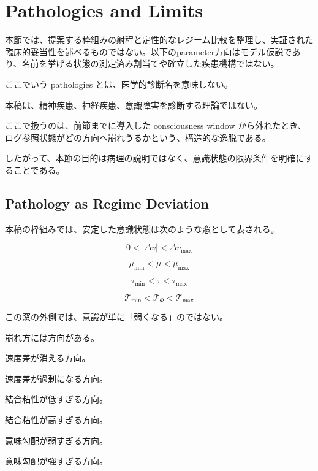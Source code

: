 \section{Pathologies and Limits}


本節では、提案する枠組みの射程と定性的なレジーム比較を整理し、実証された臨床的妥当性を述べるものではない。以下のparameter方向はモデル仮説であり、名前を挙げる状態の測定済み割当てや確立した疾患機構ではない。

ここでいう pathologies とは、医学的診断名を意味しない。

本稿は、精神疾患、神経疾患、意識障害を診断する理論ではない。

ここで扱うのは、前節までに導入した consciousness window から外れたとき、ログ参照状態がどの方向へ崩れうるかという、構造的な逸脱である。

したがって、本節の目的は病理の説明ではなく、意識状態の限界条件を明確にすることである。

\subsection{Pathology as Regime Deviation}

本稿の枠組みでは、安定した意識状態は次のような窓として表される。

\begin{equation}
0 < |\Delta v| < \Delta v_{\max}
\end{equation}

\begin{equation}
\mu_{\min} < \mu < \mu_{\max}
\end{equation}

\begin{equation}
\tau_{\min} < \tau < \tau_{\max}
\end{equation}

\begin{equation}
\mathcal{T}_{\min}
<
\mathcal{T}_{\Phi}
<
\mathcal{T}_{\max}
\end{equation}

この窓の外側では、意識が単に「弱くなる」のではない。

崩れ方には方向がある。

速度差が消える方向。

速度差が過剰になる方向。

結合粘性が低すぎる方向。

結合粘性が高すぎる方向。

意味勾配が弱すぎる方向。

意味勾配が強すぎる方向。

